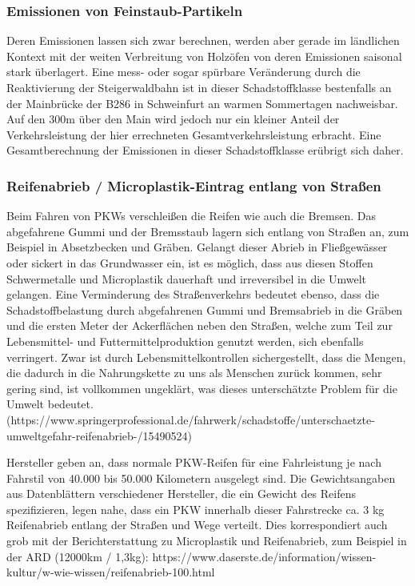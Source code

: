 \documentclass[fontsize=12pt,a4paper]{scrreprt}
\begin{document}
\subsubsection{Emissionen von Feinstaub-Partikeln}

Deren Emissionen lassen sich zwar berechnen, werden aber gerade im ländlichen Kontext mit der weiten Verbreitung von Holzöfen von deren Emissionen saisonal stark überlagert. Eine mess- oder sogar spürbare Veränderung durch die Reaktivierung der Steigerwaldbahn ist in dieser Schadstoffklasse bestenfalls an der Mainbrücke der B286 in Schweinfurt an warmen Sommertagen nachweisbar. Auf den 300m über den Main wird jedoch nur ein kleiner Anteil der Verkehrsleistung der hier errechneten Gesamtverkehrsleistung erbracht. Eine Gesamtberechnung der Emissionen in dieser Schadstoffklasse erübrigt sich daher.

\subsubsection{Reifenabrieb / Microplastik-Eintrag entlang von Straßen}
Beim Fahren von PKWs verschleißen die Reifen wie auch die Bremsen. Das abgefahrene Gummi und der Bremsstaub lagern sich entlang von Straßen an, zum Beispiel in Absetzbecken und Gräben. Gelangt dieser Abrieb in Fließgewässer oder sickert in das Grundwasser ein, ist es möglich, dass aus diesen Stoffen Schwermetalle und Microplastik dauerhaft und irreversibel in die Umwelt gelangen. Eine Verminderung des Straßenverkehrs bedeutet ebenso, dass die Schadstoffbelastung durch abgefahrenen Gummi und Bremsabrieb in die Gräben und die ersten Meter der Ackerflächen neben den Straßen, welche zum Teil zur Lebensmittel- und Futtermittelproduktion genutzt werden, sich ebenfalls verringert. Zwar ist durch Lebensmittelkontrollen sichergestellt, dass die Mengen, die dadurch in die Nahrungskette zu uns als Menschen zurück kommen, sehr gering sind, ist vollkommen ungeklärt, was dieses unterschätzte Problem für die Umwelt bedeutet. (https://www.springerprofessional.de/fahrwerk/schadstoffe/unterschaetzte-umweltgefahr-reifenabrieb-/15490524)

\vspace{1em}

Hersteller geben an, dass normale PKW-Reifen für eine Fahrleistung je nach Fahrstil von 40.000 bis 50.000 Kilometern ausgelegt sind. Die Gewichtsangaben aus Datenblättern verschiedener Hersteller, die ein Gewicht des Reifens spezifizieren, legen nahe, dass ein PKW innerhalb dieser Fahrstrecke ca. 3 kg Reifenabrieb entlang der Straßen und Wege verteilt. Dies korrespondiert auch grob mit der Berichterstattung zu Microplastik und Reifenabrieb, zum Beispiel in der ARD (12000km / 1,3kg): https://www.daserste.de/information/wissen-kultur/w-wie-wissen/reifenabrieb-100.html
\end{document}
